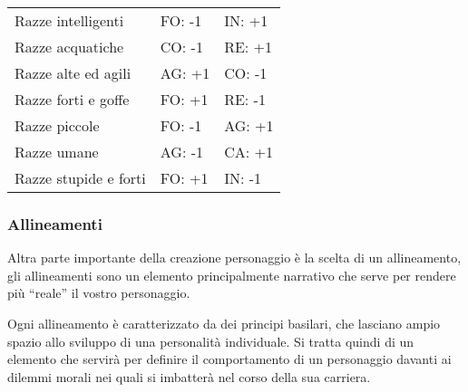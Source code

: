 \documentclass[../manuale_main.tex]{subfiles}
\begin{document}
\begin{tabular}{l l l}

Razze intelligenti&FO: -1&IN: +1\\

Razze acquatiche&CO: -1&RE: +1\\

 Razze alte ed agili&AG: +1&CO: -1\\

Razze forti e goffe&FO: +1&RE: -1\\

Razze piccole&FO: -1&AG: +1\\

Razze umane&AG: -1&CA: +1\\

Razze stupide e forti&FO: +1&IN: -1\\

\end{tabular}

\subsubsection{Allineamenti}

Altra parte importante della creazione personaggio è la scelta di un allineamento, gli allineamenti sono un elemento principalmente narrativo che serve per rendere più ``reale” il vostro personaggio.

Ogni allineamento è caratterizzato da dei principi basilari, che lasciano ampio spazio allo sviluppo di una personalità individuale. Si tratta quindi di un elemento che servirà per definire il comportamento di un personaggio davanti ai dilemmi morali nei quali si imbatterà nel corso della sua carriera. 
\end{document}
